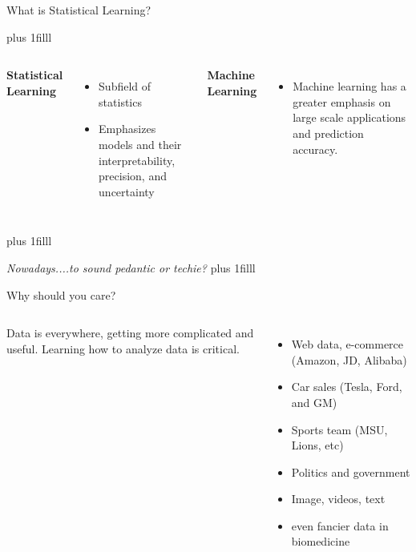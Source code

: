 \documentclass[aspectratio=169,dvipsnames]{beamer}
\newcommand{\bvfill}{\vskip0pt plus 1filll}
\begin{document}
%
%
\begin{frame}{What is Statistical Learning?}


	\bvfill
	\begin{columns}
	\centering
\textbf{Statistical Learning}
\begin{itemize}
	\item Subfield of statistics
	\item Emphasizes models and their interpretability, precision, and uncertainty
\end{itemize}

	\centering
	\textbf{Machine Learning }

	\begin{itemize}
\item
Machine learning has a greater emphasis on large scale applications and prediction accuracy.
	\end{itemize}
	\end{columns}

	\bvfill \centering

	\textit{Nowadays....to sound pedantic or techie?}
	\bvfill

\end{frame}
\begin{frame}[c]{Why should you care?}

\begin{columns}

Data is everywhere, getting more complicated and useful. Learning how to analyze data is critical.
\begin{itemize}
	\item
Web data, e-commerce (Amazon, JD, Alibaba)
	\item
Car sales (Tesla, Ford, and GM)
	\item
Sports team (MSU, Lions, etc)
\item Politics and government
\item Image, videos, text
\item even fancier data in biomedicine

\end{itemize}



\end{columns}

\end{frame}
\end{document}
